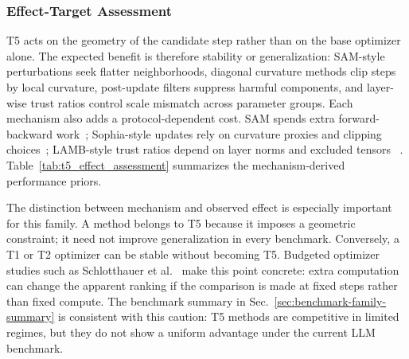 \subsubsection{Effect-Target Assessment}
\label{sec:t5-effect-assessment}

T5 acts on the geometry of the candidate step rather than on the base
optimizer alone.  The expected benefit is therefore stability or
generalization: SAM-style perturbations seek flatter neighborhoods, diagonal
curvature methods clip steps by local curvature, post-update filters suppress
harmful components, and layer-wise trust ratios control scale mismatch across
parameter groups.  Each mechanism also adds a protocol-dependent cost.  SAM
spends extra forward-backward work~\citep{foret2021sharpness}; Sophia-style
updates rely on curvature proxies and clipping choices~\citep{liu2023sophia};
LAMB-style trust ratios depend on layer norms and excluded tensors
~\citep{you2019large}.  Table~\ref{tab:t5_effect_assessment} summarizes the
mechanism-derived performance priors.



The distinction between mechanism and observed effect is especially important
for this family.  A method belongs to T5 because it imposes a geometric
constraint; it need not improve generalization in every benchmark.  Conversely,
a T1 or T2 optimizer can be stable without becoming T5.  Budgeted optimizer
studies such as Schlotthauer et al.~\citep{schlotthauer2025budget} make this
point concrete: extra computation can change the apparent ranking if the
comparison is made at fixed steps rather than fixed compute.  The benchmark
summary in Sec.~\ref{sec:benchmark-family-summary} is consistent with this
caution: T5 methods are competitive in limited regimes, but they do not show a
uniform advantage under the current LLM benchmark.